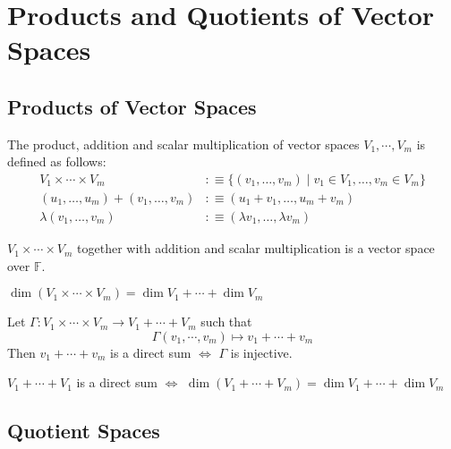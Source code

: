 \section{Products and Quotients of Vector Spaces}
\subsection{Products of Vector Spaces}

\begin{mydef}The product, addition and scalar multiplication of vector spaces $V_1, \cdots, V_m$ is defined as follows:
  \begin{equation}
    \begin{aligned}
      V_1 \times \cdots \times V_m &:\equiv \{ (v_1, \dots, v_m) \mid v_1 \in V_1, \dots, v_m \in V_m\} \\
      (u_1, \dots, u_m) + (v_1, \dots, v_m) &:\equiv (u_1+v_1, \dots, u_m+v_m) \\
      \lambda (v_1, \dots, v_m) &:\equiv (\lambda v_1, \dots, \lambda v_m)
    \end{aligned}
  \end{equation}
\end{mydef}

\setcounter{thm}{88}
\begin{thm}
  $V_1 \times \cdots \times V_m$ together with addition and scalar multiplication is a vector space over $\mathbb{F}$.
\end{thm}

\setcounter{thm}{91}
\begin{thm}
  $\dim (V_1 \times \cdots \times V_m) = \dim V_1 + \cdots + \dim V_m$
\end{thm}

\begin{thm}
  Let $\Gamma: V_1 \times \cdots \times V_m \to V_1 + \cdots + V_m$ such that
  \begin{equation}
    \Gamma(v_1, \cdots, v_m) \mapsto v_1 + \cdots + v_m
  \end{equation}
  Then $v_1 + \cdots + v_m$ is a direct sum $\iff$ $\Gamma$ is injective.
\end{thm}

\begin{thm}$V_1 + \cdots + V_1$ is a direct sum $\iff$
  $\dim (V_1+\cdots+V_m) = \dim V_1 + \cdots + \dim V_m$
\end{thm}

\subsection{Quotient Spaces}

